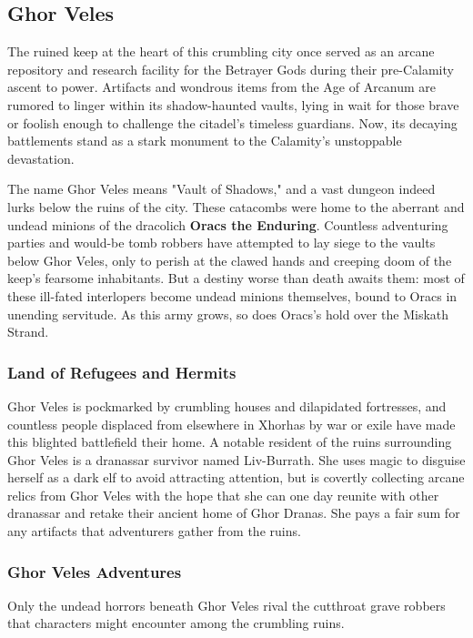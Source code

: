 \documentclass[10pt,a4paper,twoside,bg=print,twocolumn,openany,nodeprecatedcode]{dndbook}
\begin{document}
\subsection{Ghor Veles}
The ruined keep at the heart of this crumbling city once served as an arcane repository and research facility for the Betrayer Gods during their pre-Calamity ascent to power. Artifacts and wondrous items from the Age of Arcanum are rumored to linger within its shadow-haunted vaults, lying in wait for those brave or foolish enough to challenge the citadel's timeless guardians. Now, its decaying battlements stand as a stark monument to the Calamity's unstoppable devastation.

The name Ghor Veles means "Vault of Shadows," and a vast dungeon indeed lurks below the ruins of the city. These catacombs were home to the aberrant and undead minions of the dracolich \textbf{Oracs the Enduring}. Countless adventuring parties and would-be tomb robbers have attempted to lay siege to the vaults below Ghor Veles, only to perish at the clawed hands and creeping doom of the keep's fearsome inhabitants. But a destiny worse than death awaits them: most of these ill-fated interlopers become undead minions themselves, bound to Oracs in unending servitude. As this army grows, so does Oracs's hold over the Miskath Strand.

\subsubsection{Land of Refugees and Hermits}
Ghor Veles is pockmarked by crumbling houses and dilapidated fortresses, and countless people displaced from elsewhere in Xhorhas by war or exile have made this blighted battlefield their home. A notable resident of the ruins surrounding Ghor Veles is a dranassar survivor named Liv-Burrath. She uses magic to disguise herself as a dark elf to avoid attracting attention, but is covertly collecting arcane relics from Ghor Veles with the hope that she can one day reunite with other dranassar and retake their ancient home of Ghor Dranas. She pays a fair sum for any artifacts that adventurers gather from the ruins.

\subsubsection{Ghor Veles Adventures}
Only the undead horrors beneath Ghor Veles rival the cutthroat grave robbers that characters might encounter among the crumbling ruins.
\end{document}

